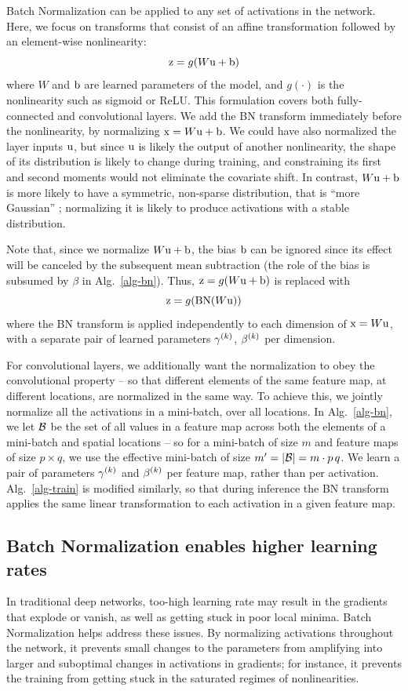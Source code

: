 \documentclass[twocolumn]{article}
\begin{document}
Batch Normalization can be applied to any set of activations in the network. Here, we focus on transforms that
consist of an affine transformation  followed by an element-wise
nonlinearity: $$\mathrm{z} = g(W\mathrm{u}+\mathrm{b})$$ where $W$ and $\mathrm{b}$ are learned parameters of the
model, and $g(\cdot)$ is the nonlinearity such as sigmoid or
ReLU. This formulation covers both fully-connected and convolutional layers. We add the BN transform immediately before the nonlinearity, by normalizing $\mathrm{x}=W\mathrm{u}+\mathrm{b}$.  We could have also normalized the layer inputs $\mathrm{u}$, but 
since $\mathrm{u}$ is likely the output of another nonlinearity, the
shape of its distribution is likely to change during training, and constraining its first and second moments would not eliminate the covariate shift.
In contrast,  $W\mathrm{u}+\mathrm{b}$ is more likely to have a symmetric, non-sparse distribution,
that is ``more Gaussian'' \cite{ica}; normalizing it is likely to produce activations with a stable  distribution.

Note that, since we normalize $W\mathrm{u}+\mathrm{b}$, the bias $\mathrm{b}$ can be ignored since its
effect will be canceled by the subsequent mean subtraction (the role of the bias is subsumed by $\beta$ in Alg.~\ref{alg-bn}). Thus,  $\mathrm{z} = g(W\mathrm{u}+\mathrm{b})$  is replaced with
$$
\mathrm{z} = g(\text{BN}(W\mathrm{u}))
$$
where the BN transform is applied independently to each dimension of $\mathrm{x}=W\mathrm{u}$, with a separate pair of learned parameters $\gamma^{(k)}$, $\beta^{(k)}$ per dimension.

For convolutional layers, we  additionally want the normalization
to  obey the convolutional property -- so that different elements
of the same feature map, at different locations, are normalized in the
same way. To achieve this, we jointly normalize all the activations in
a mini-batch, over all locations. In Alg.~\ref{alg-bn}, we let
$\mathcal{B}$ be the set of all values in a feature map across both the
elements of a mini-batch and spatial locations -- so for a mini-batch
of size $m$ and feature maps of size $p\times q$, we use the effective mini-batch of size $m'=|\mathcal{B}| =
m\cdot p\, q$. We learn a pair of parameters $\gamma^{(k)}$ and $\beta^{(k)}$ per feature map, rather than per activation.
Alg.~\ref{alg-train} is modified similarly, so that during inference the BN transform applies the same linear transformation to each activation in a given feature map. 
	
\subsection{ Batch Normalization enables higher learning rates} 
\label{sec-lr}
 In
traditional deep networks, too-high learning rate may result in the gradients that explode or vanish, as well as getting stuck in poor local minima. Batch Normalization helps address these issues. By normalizing activations throughout the network, it prevents small changes to the parameters from amplifying into larger and suboptimal changes in activations in gradients; for instance, it prevents the training from getting stuck in the saturated regimes of nonlinearities.   
\end{document}
